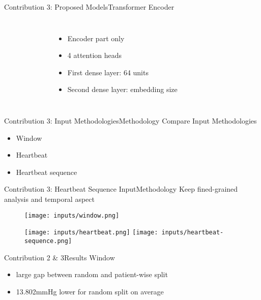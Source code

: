 \begin{frame}{Contribution 3: Proposed Models}{Transformer Encoder}
    \begin{columns}
        \begin{figure}
            
        \end{figure}

        \begin{itemize}
            \item Encoder part only
            \item 4 attention heads
            \item First dense layer: 64 units
            \item Second dense layer: embedding size
        \end{itemize}
    \end{columns}


\end{frame}\begin{frame}{Contribution 3: Input Methodologies}{Methodology}
    Compare Input Methodologies
    \begin{itemize}
        \item Window
        \item Heartbeat
        \item Heartbeat sequence
    \end{itemize}
\end{frame}

\begin{frame}{Contribution 3: Heartbeat Sequence Input}{Methodology}
    Keep fined-grained analysis and temporal aspect
    \begin{figure}
        \texttt{[image: inputs/window.png]}

        \texttt{[image: inputs/heartbeat.png]}
        \texttt{[image: inputs/heartbeat-sequence.png]}
    \end{figure}
\end{frame}


\begin{frame}{Contribution 2 \& 3}{Results}
    \centering
    Window
    \begin{figure}
        
        \hfill
        
    \end{figure}
    \begin{itemize}
        \item large gap between random and patient-wise split
        \item 13.802mmHg lower for random split on average
    \end{itemize}
\end{frame}


